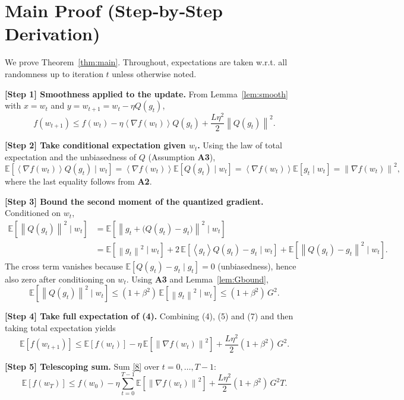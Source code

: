 \documentclass{article}
\newcommand{\E}{\mathbb{E}}
\newcommand{\norm}[1]{\left\lVert#1\right\rVert}
\newcommand{\inner}[1]{\left\langle#1\right\rangle}
\begin{document}
\section*{Main Proof (Step‑by‑Step Derivation)}
We prove Theorem~\ref{thm:main}. Throughout, expectations are taken w.r.t. all randomness up to iteration $t$ unless otherwise noted.

\medskip
\noindent\textbf{[Step 1] Smoothness applied to the update.}  
From Lemma~\ref{lem:smooth} with $x=w_{t}$ and $y=w_{t+1}=w_{t}-\eta Q(g_{t})$,
\[
f(w_{t+1})\le f(w_{t})-\eta\inner{\nabla f(w_{t})}{Q(g_{t})}
+\frac{L\eta^{2}}{2}\norm{Q(g_{t})}^{2}.
\tag{4}
\]

\noindent\textbf{[Step 2] Take conditional expectation given $w_{t}$.}  
Using the law of total expectation and the unbiasedness of $Q$ (Assumption \textbf{A3}),
\[
\E\!\left[\inner{\nabla f(w_{t})}{Q(g_{t})}\mid w_{t}\right]
= \inner{\nabla f(w_{t})}{\E[Q(g_{t})\mid w_{t}]}
= \inner{\nabla f(w_{t})}{\E[g_{t}\mid w_{t}]}
= \norm{\nabla f(w_{t})}^{2},
\tag{5}
\]
where the last equality follows from \textbf{A2}.

\noindent\textbf{[Step 3] Bound the second moment of the quantized gradient.}  
Conditioned on $w_{t}$,
\[
\begin{aligned}
\E\!\left[\norm{Q(g_{t})}^{2}\mid w_{t}\right] 
&= \E\!\left[\norm{g_{t}+ \bigl(Q(g_{t})-g_{t}\bigr)}^{2}\mid w_{t}\right] \\
&= \E\!\left[\norm{g_{t}}^{2}\mid w_{t}\right]
   + 2\,\E\!\left[\inner{g_{t}}{Q(g_{t})-g_{t}}\mid w_{t}\right]
   + \E\!\left[\norm{Q(g_{t})-g_{t}}^{2}\mid w_{t}\right].
\end{aligned}
\tag{6}
\]
The cross term vanishes because $\E[Q(g_{t})-g_{t}\mid g_{t}]=0$ (unbiasedness), hence also zero after conditioning on $w_{t}$. Using \textbf{A3} and Lemma~\ref{lem:Gbound},
\[
\E\!\left[\norm{Q(g_{t})}^{2}\mid w_{t}\right]
\le (1+\beta^{2})\,\E\!\left[\norm{g_{t}}^{2}\mid w_{t}\right]
\le (1+\beta^{2})\,G^{2}.
\tag{7}
\]

\noindent\textbf{[Step 4] Take full expectation of (4).}  
Combining (4), (5) and (7) and then taking total expectation yields
\[
\E\!\left[f(w_{t+1})\right]
\le \E\!\left[f(w_{t})\right]
-\eta\,\E\!\left[\norm{\nabla f(w_{t})}^{2}\right]
+\frac{L\eta^{2}}{2}(1+\beta^{2})\,G^{2}.
\tag{8}
\]

\noindent\textbf{[Step 5] Telescoping sum.}  
Sum \eqref{8} over $t=0,\dots,T-1$:
\[
\E\!\left[f(w_{T})\right]
\le f(w_{0})
-\eta\sum_{t=0}^{T-1}\E\!\left[\norm{\nabla f(w_{t})}^{2}\right]
+\frac{L\eta^{2}}{2}(1+\beta^{2})\,G^{2}T .
\tag{9}
\]
\end{document}
